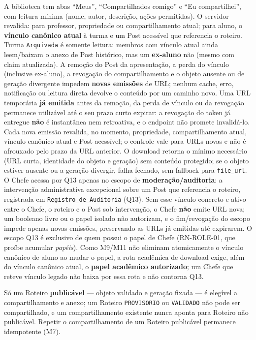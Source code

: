 \begin{regra}
A biblioteca tem abas ``Meus'', ``Compartilhados comigo'' e ``Eu compartilhei'',
com leitura mínima (nome, autor, descrição, ações permitidas). O servidor
revalida: para professor, propriedade ou compartilhamento atual; para aluno, o
\textbf{vínculo canônico atual} à turma e um Post acessível que referencia o
roteiro. Turma \texttt{Arquivada} é somente leitura: membros com vínculo atual
ainda leem/baixam o anexo de Post histórico, mas um \textbf{ex-aluno} não
(mesmo com claim atualizada). A remoção do Post da apresentação, a perda do
vínculo (inclusive ex-aluno), a revogação do compartilhamento e o objeto
ausente ou de geração divergente impedem \textbf{novas emissões} de URL; nenhum
cache, erro, notificação ou leitura direta devolve o conteúdo por um caminho
novo. Uma URL temporária \textbf{já emitida} antes da remoção, da perda de
vínculo ou da revogação permanece utilizável até o seu prazo curto expirar: a
revogação do token já entregue \textbf{não} é instantânea nem retroativa, e o
endpoint não promete invalidá-lo. Cada nova emissão revalida, no momento,
propriedade, compartilhamento atual, vínculo canônico atual e Post acessível; o
controle vale para URLs novas e não é afrouxado pelo prazo da URL anterior. O
download retorna o mínimo necessário (URL curta, identidade do objeto e geração)
sem conteúdo protegido; se o objeto estiver ausente ou a geração divergir, falha
fechado, sem fallback para \texttt{file\_url}. O Chefe acessa por Q13 apenas no
escopo de \textbf{moderação/auditoria}: a intervenção administrativa excepcional
sobre um Post que referencia o roteiro, registrada em
\texttt{Registro\_de\_Auditoria} (Q13). Sem esse vínculo concreto e ativo entre o
Chefe, o roteiro e o Post sob intervenção, o Chefe \textbf{não} emite URL nova;
um booleano livre ou o papel isolado não autorizam, e o fim/revogação do escopo
impede apenas novas emissões, preservando as URLs já emitidas até expirarem. O
escopo Q13 é exclusivo de quem possui o papel de Chefe (RN-ROLE-01, que proíbe
acumular \emph{papéis}). Como M9/M11 não eliminam atomicamente o vínculo
canônico de aluno ao mudar o papel, a rota acadêmica de download exige, além do
vínculo canônico atual, o \textbf{papel acadêmico autorizado}; um Chefe que
reteve vínculo legado não baixa por essa rota e não contorna Q13.
\end{regra}

\begin{regra}
Só um Roteiro \textbf{publicável} --- objeto validado e geração fixada --- é
elegível a compartilhamento e anexo; um Roteiro \texttt{PROVISORIO} ou
\texttt{VALIDADO} não pode ser compartilhado, e um compartilhamento existente
nunca aponta para Roteiro não publicável. Repetir o compartilhamento de um
Roteiro publicável permanece idempotente (M7).
\end{regra}


